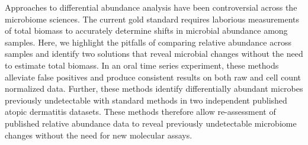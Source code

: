 Approaches to differential abundance analysis have been controversial across the microbiome sciences.
The current gold standard requires laborious measurements of total biomass to accurately determine shifts
in microbial abundance among samples. Here, we highlight the pitfalls of comparing relative abundance across
samples and identify two solutions that reveal microbial changes without the need to estimate total biomass.
In an oral time series experiment, these methods alleviate false positives and produce consistent results
on both raw and cell count normalized data. Further, these methods identify differentially abundant
microbes previously undetectable with standard methods in two independent published atopic dermatitis
datasets. These methods therefore allow re-assessment of published relative abundance data to reveal
previously undetectable microbiome changes without the need for new molecular assays.

